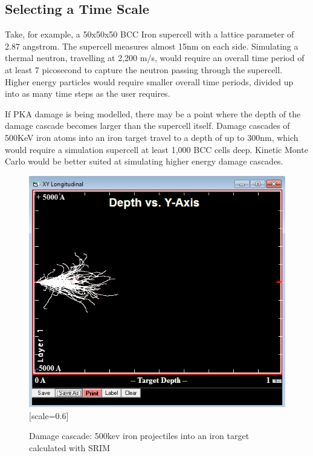 \subsection{Selecting a Time Scale}

Take, for example, a 50x50x50 BCC Iron supercell with a lattice parameter of 2.87 angstrom.  The supercell measures almost 15nm on each side.  Simulating a thermal neutron, travelling at 2,200 m/s, would require an overall time period of at least 7 picosecond to capture the neutron passing through the supercell.  Higher energy particles would require smaller overall time periods, divided up into as many time steps as the user requires.  

If PKA damage is being modelled, there may be a point where the depth of the damage cascade becomes larger than the supercell itself.  Damage cascades of 500KeV iron atoms into an iron target travel to a depth of up to 300nm, which would require a simulation supercell at least 1,000 BCC cells deep.  Kinetic Monte Carlo would be better suited at simulating higher energy damage cascades.   

\begin{figure}[h]
  \begin{center}
    \includegraphics[scale=0.70]{chapters/background_potential_fitting/plots/fe500kev.png}[scale=0.6]
    \caption{Damage cascade: 500kev iron projectiles into an iron target calculated with SRIM}
    \label{graph:fe500kev}
  \end{center}
\end{figure}




